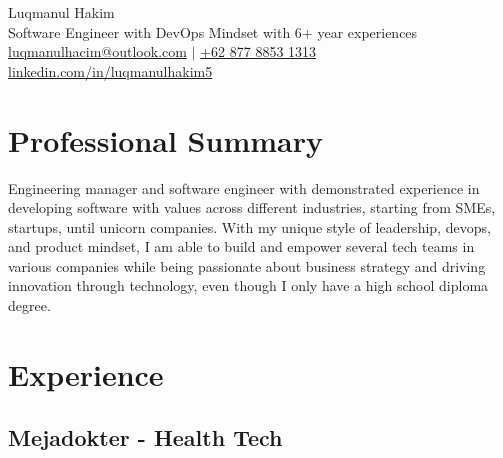 \documentclass[11pt]{article}
\begin{document}
\begin{center}
    {\fontsize{36}{36}\selectfont \interheavy Luqmanul Hakim} \\ \bigskip
    {\color{gray}\fontsize{13}{13}\selectfont Software Engineer with DevOps Mindset with 6+ year experiences} \\ \bigskip
    {\color{icnclr}\faEnvelope[regular]} \href{mailto:luqmanulhacim@outlook.com}{luqmanulhacim@outlook.com} $|$
    {\color{icnclr}} \href{tel:+6287788531313}{+62 877 8853 1313}
    \\ {\color{icnclr}\faLinkedinIn} \href{https://www.linkedin.com/in/luqmanulhakim5}{linkedin.com/in/luqmanulhakim5}
\end{center}

\section{Professional Summary}
 {Engineering manager and software engineer with demonstrated experience in developing software with
  values across different industries, starting from SMEs, startups, until unicorn companies. With my unique
  style of leadership, devops, and product mindset, I am able to build and empower several tech teams in
  various companies while being passionate about business strategy and driving innovation through
  technology, even though I only have a high school diploma degree.}


\section{Experience}
\subsection{Mejadokter - Health Tech}
\end{document}
